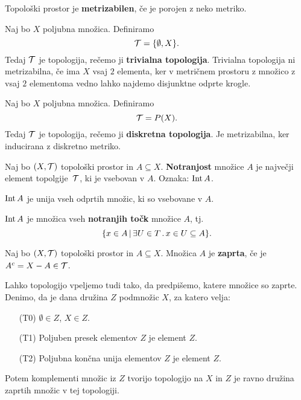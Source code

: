 \begin{definicija}
    Topološki prostor je \textbf{metrizabilen}, če je porojen z neko metriko.
\end{definicija}

\begin{primer}
    Naj bo $X$ poljubna množica. Definiramo $$\mathcal{T} = \{\emptyset, X\}.$$ Tedaj $\mathcal{T}$ je topologija, rečemo ji \textbf{trivialna topologija}.
    Trivialna topologija ni metrizabilna, če ima $X$ vsaj $2$ elementa, ker v metričnem prostoru z množico z vsaj $2$ elementoma vedno lahko najdemo disjunktne odprte krogle.
\end{primer}

\begin{primer}
    Naj bo $X$ poljubna množica. Definiramo $$\mathcal{T} = P(X).$$ Tedaj $\mathcal{T}$ je topologija, rečemo ji \textbf{diskretna topologija}.
    Je metrizabilna, ker inducirana z diskretno metriko.
\end{primer}

\begin{definicija}
    Naj bo $(X, \mathcal{T})$ topološki prostor in $A \subseteq X$. \textbf{Notranjost} množice $A$ je največji element topolgije~$\mathcal{T}$, ki je vsebovan v $A$. Oznaka: $\operatorname{Int} A$.
\end{definicija}

\begin{trditev}
    $\operatorname{Int} A$ je unija vseh odprtih množic, ki so vsebovane v $A$.
\end{trditev}

\begin{trditev}
    $\operatorname{Int} A$ je množica vseh \textbf{notranjih točk} množice $A$, tj. $$\{x \in A \,|\, \exists U \in T \,.\, x \in U \subseteq A\}.$$
\end{trditev}

\begin{definicija}
    Naj bo $(X, \mathcal{T})$ topološki prostor in $A \subseteq X$. Množica $A$ je \textbf{zaprta}, če je $A^c = X - A \in \mathcal{T}$.
\end{definicija}

\begin{opomba}
    Lahko topologijo vpeljemo tudi tako, da predpišemo, katere množice so zaprte.
    Denimo, da je dana družina $Z$ podmnožic $X$, za katero velja:
    \begin{enumerate}
        \item[(T0)] $\emptyset \in Z$, $X \in Z$.
        \item[(T1)] Poljuben presek elementov $Z$ je element $Z$.
        \item[(T2)] Poljubna končna unija elementov $Z$ je element $Z$.
    \end{enumerate}
    Potem komplementi množic iz $Z$ tvorijo topologijo na $X$ in $Z$ je ravno družina zaprtih množic v tej topologiji.
\end{opomba}

